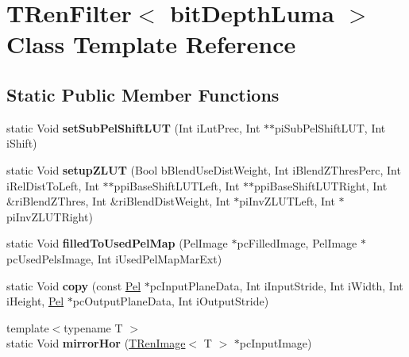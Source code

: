 \hypertarget{class_t_ren_filter}{}\section{T\+Ren\+Filter$<$ bit\+Depth\+Luma $>$ Class Template Reference}
\label{class_t_ren_filter}
\subsection*{Static Public Member Functions}
\begin{DoxyCompactItemize}
\item 
\mbox{\label{class_t_ren_filter_ad648cdf445d7d69dcb610305b59b11c0}} 
static Void {\bfseries set\+Sub\+Pel\+Shift\+L\+UT} (Int i\+Lut\+Prec, Int $\ast$$\ast$pi\+Sub\+Pel\+Shift\+L\+UT, Int i\+Shift)
\item 
\mbox{\label{class_t_ren_filter_ac238184f9ae4841e2014d603e4bf5cab}} 
static Void {\bfseries setup\+Z\+L\+UT} (Bool b\+Blend\+Use\+Dist\+Weight, Int i\+Blend\+Z\+Thres\+Perc, Int i\+Rel\+Dist\+To\+Left, Int $\ast$$\ast$ppi\+Base\+Shift\+L\+U\+T\+Left, Int $\ast$$\ast$ppi\+Base\+Shift\+L\+U\+T\+Right, Int \&ri\+Blend\+Z\+Thres, Int \&ri\+Blend\+Dist\+Weight, Int $\ast$pi\+Inv\+Z\+L\+U\+T\+Left, Int $\ast$pi\+Inv\+Z\+L\+U\+T\+Right)
\item 
\mbox{\label{class_t_ren_filter_a76b15ce218cd7eb8a244000c345a0f78}} 
static Void {\bfseries filled\+To\+Used\+Pel\+Map} (Pel\+Image $\ast$pc\+Filled\+Image, Pel\+Image $\ast$pc\+Used\+Pels\+Image, Int i\+Used\+Pel\+Map\+Mar\+Ext)
\item 
\mbox{\label{class_t_ren_filter_aa924cefa5138454b95aa9003ce7e8622}} 
static Void {\bfseries copy} (const \hyperlink{_type_def_8h_af92141699657699b4b547be0c8517541}{Pel} $\ast$pc\+Input\+Plane\+Data, Int i\+Input\+Stride, Int i\+Width, Int i\+Height, \hyperlink{_type_def_8h_af92141699657699b4b547be0c8517541}{Pel} $\ast$pc\+Output\+Plane\+Data, Int i\+Output\+Stride)
\item 
\mbox{\label{class_t_ren_filter_aba937e96a059ffa65958b74873ab1cd0}} 
{\footnotesize template$<$typename T $>$ }\\static Void {\bfseries mirror\+Hor} (\hyperlink{class_t_ren_image}{T\+Ren\+Image}$<$ T $>$ $\ast$pc\+Input\+Image)
$$
\end{DoxyCompactItemize}
